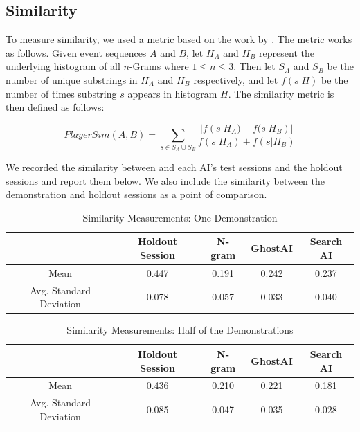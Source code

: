 \subsection{Similarity}

To measure similarity, we used a metric based on the work by \cite{simil}. The metric works as follows. Given event sequences $A$ and $B$, let $H_A$ and $H_B$ represent the underlying histogram of all $n$-Grams where $1 \le n \le 3$. Then let $S_A$ and $S_B$ be the number of unique substrings in $H_A$ and $H_B$ respectively, and let $f(s|H)$ be the number of times substring $s$ appears in histogram $H$. The similarity metric is then defined as follows:

$$PlayerSim(A,B) = \sum_{s \in S_A \cup S_B} \frac{|f(s|H_A) - f(s|H_B)|}{f(s|H_A) + f(s|H_B)}$$

We recorded the similarity between and each AI's test sessions and the holdout sessions and report them below. We also include the similarity between the demonstration and holdout sessions as a point of comparison. 


\begin{table}[h]
	\centering
	\caption{ Similarity Measurements: One Demonstration }
	\begin{tabular}	{| c | c | c | c | c |}
		\hline
		& Holdout Session & N-gram & GhostAI & Search AI \\
		\hline
		Mean &
		0.447&
		0.191&
		0.242&
		0.237\\
		\hline
		Avg. Standard Deviation & 
		0.078 &
		0.057 &
		0.033 &
		0.040 \\
		\hline
	\end{tabular}
	\label{Similarity}
\end{table}

\begin{table}[h]
	\centering
	\caption{ Similarity Measurements: Half of the Demonstrations }
	\begin{tabular}	{| c | c | c | c | c |}
		\hline
		& Holdout Session & N-gram & GhostAI & Search AI \\
		\hline
		Mean &
		0.436&
		0.210&
		0.221&
		0.181\\
		\hline
		Avg. Standard Deviation & 
		0.085&
		0.047&
		0.035&
		0.028\\
		\hline
	\end{tabular}
	\label{Similarity}
\end{table}

